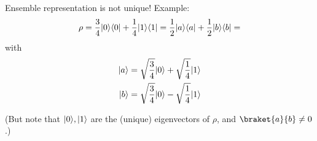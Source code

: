 Ensemble representation is not unique! Example:
\begin{equation*}
    \rho = \frac{3}{4} \lvert0\rangle \langle0\rvert + \frac{1}{4} \lvert1\rangle\langle1\rvert 
    = \frac{1}{2} \lvert a\rangle \langle a\rvert + \frac{1}{2} \lvert b\rangle\langle b\rvert = 
\end{equation*}
with 
\begin{align*}
    \lvert a\rangle &= \sqrt{\frac{3}{4}} \lvert0\rangle + \sqrt{\frac{1}{4}} \lvert1\rangle \\
    \lvert b\rangle &= \sqrt{\frac{3}{4}} \lvert0\rangle - \sqrt{\frac{1}{4}} \lvert1\rangle \\
\end{align*}

(But note that $\lvert0\rangle, \lvert1\rangle$ are the (unique) eigenvectors of $\rho$, 
and $\braket{a}{b} \neq 0$.)